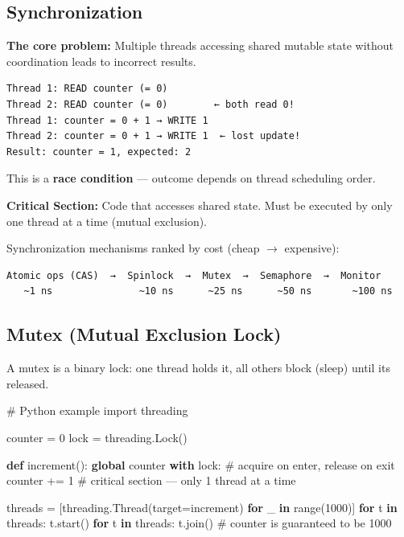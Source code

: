 \documentclass[11pt]{article}
\newenvironment{Shaded}{\begin{snugshade}}{\end{snugshade}}
\newcommand{\BuiltInTok}[1]{\textcolor[rgb]{0.50,0.55,0.55}{#1}}
\newcommand{\CommentTok}[1]{\textcolor[rgb]{0.48,0.49,0.49}{#1}}
\newcommand{\ControlFlowTok}[1]{\textcolor[rgb]{0.99,0.74,0.29}{\textbf{#1}}}
\newcommand{\DecValTok}[1]{\textcolor[rgb]{0.96,0.45,0.00}{#1}}
\newcommand{\ImportTok}[1]{\textcolor[rgb]{0.15,0.68,0.38}{#1}}
\newcommand{\KeywordTok}[1]{\textcolor[rgb]{0.81,0.81,0.76}{\textbf{#1}}}
\newcommand{\NormalTok}[1]{\textcolor[rgb]{0.81,0.81,0.76}{#1}}
\newcommand{\OperatorTok}[1]{\textcolor[rgb]{0.81,0.81,0.76}{#1}}
\begin{document}
\subsection{Synchronization}\label{synchronization}

\textbf{The core problem:} Multiple threads accessing shared mutable state without coordination leads to incorrect results.

\setcodelang{}

\begin{verbatim}
Thread 1: READ counter (= 0)
Thread 2: READ counter (= 0)        ← both read 0!
Thread 1: counter = 0 + 1 → WRITE 1
Thread 2: counter = 0 + 1 → WRITE 1  ← lost update!
Result: counter = 1, expected: 2
\end{verbatim}

This is a \textbf{race condition} --- outcome depends on thread scheduling order.

\textbf{Critical Section:} Code that accesses shared state. Must be executed by only one thread at a time (mutual exclusion).

Synchronization mechanisms ranked by cost (cheap \(\rightarrow\) expensive):

\setcodelang{}

\begin{verbatim}
Atomic ops (CAS)  →  Spinlock  →  Mutex  →  Semaphore  →  Monitor
   ~1 ns               ~10 ns      ~25 ns      ~50 ns       ~100 ns
\end{verbatim}

\subsection{Mutex (Mutual Exclusion Lock)}\label{mutex-mutual-exclusion-lock}

A mutex is a binary lock: one thread holds it, all others block (sleep) until it\textquotesingle s released.


\begin{Shaded}
\begin{Highlighting}[]
\CommentTok{\# Python example}
\ImportTok{import}\NormalTok{ threading}

\NormalTok{counter }\OperatorTok{=} \DecValTok{0}
\NormalTok{lock }\OperatorTok{=}\NormalTok{ threading.Lock()}

\KeywordTok{def}\NormalTok{ increment():}
    \KeywordTok{global}\NormalTok{ counter}
    \ControlFlowTok{with}\NormalTok{ lock:          }\CommentTok{\# acquire on enter, release on exit}
\NormalTok{        counter }\OperatorTok{+=} \DecValTok{1}    \CommentTok{\# critical section — only 1 thread at a time}

\NormalTok{threads }\OperatorTok{=}\NormalTok{ [threading.Thread(target}\OperatorTok{=}\NormalTok{increment) }\ControlFlowTok{for}\NormalTok{ \_ }\KeywordTok{in} \BuiltInTok{range}\NormalTok{(}\DecValTok{1000}\NormalTok{)]}
\ControlFlowTok{for}\NormalTok{ t }\KeywordTok{in}\NormalTok{ threads: t.start()}
\ControlFlowTok{for}\NormalTok{ t }\KeywordTok{in}\NormalTok{ threads: t.join()}
\CommentTok{\# counter is guaranteed to be 1000}
\end{Highlighting}
\end{Shaded}
\end{document}
